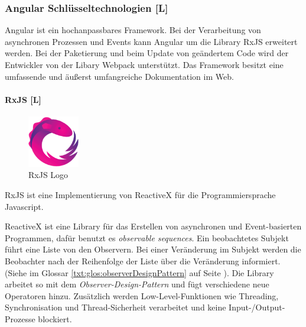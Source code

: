 \subsubsection{Angular Schlüsseltechnologien [L]}
Angular ist ein hochanpassbares Framework. Bei der Verarbeitung von asynchronen Prozessen und Events kann Angular um die Library RxJS erweitert werden. Bei der Paketierung und beim Update von geändertem Code wird der Entwickler von der Libary Webpack unterstützt. Das Framework besitzt eine umfassende und äußerst umfangreiche Dokumentation im Web.
\paragraph{RxJS [L]}
\begin{figure}
  \begin{center}
    \includegraphics[width=0.2\textwidth]{pics/RxJs_logo.png}
   \caption{RxJS Logo}
  \end{center}
\end{figure}
RxJS ist eine Implementierung von ReactiveX für die Programmiersprache Javascript.

ReactiveX ist eine Library für das Erstellen von asynchronen und Event-basierten Programmen, dafür benutzt es \emph{observable sequences}. Ein beobachtetes Subjekt führt eine Liste von den Observern. Bei einer Veränderung im Subjekt werden die Beobachter nach der Reihenfolge der Liste über die Veränderung informiert. (Siehe im Glossar \ref{txt:glos:observerDesignPattern} auf Seite \pageref{txt:glos:observerDesignPattern}).
Die Library arbeitet so mit dem \emph{Observer-Design-Pattern} und fügt verschiedene neue Operatoren hinzu. Zusätzlich werden Low-Level-Funktionen wie Threading, Synchronisation und Thread-Sicherheit verarbeitet und keine Input-/Output-Prozesse blockiert. \cite{ReactiveXIntro}

